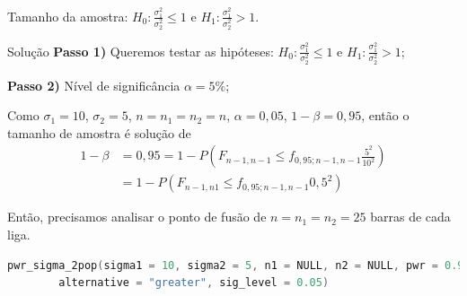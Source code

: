 \documentclass[9pt]{beamer}
\begin{document}
\begin{frame}[fragile]{Tamanho da amostra: $H_0:\frac{\sigma_1^2}{\sigma_2^2} \leq 1$ e $H_1:\frac{\sigma_1^2}{\sigma_2^2} > 1$.}

\begin{block}{Solução}
	\textbf{Passo 1)} Queremos testar as hipóteses: $H_0: \frac{\sigma_1^2}{\sigma_2^2} \leq 1$ e $H_1: \frac{\sigma_1^2}{\sigma_2^2} > 1$;
	
	\textbf{Passo 2)} Nível de significância $\alpha=5\%$;
	
	Como $\sigma_1=10$, $\sigma_2=5$, $n=n_1=n_2=n$, $\alpha=0,05$, $1-\beta = 0,95$, então o tamanho de amostra é solução de
	\begin{align*}
	1-\beta &= 0,95 = 1- P \left( F_{n-1, n-1} \leq f_{0,95; n-1, n-1} \frac{5^2}{10^2} \right)\\ 
	&= 1- P \left( F_{n-1, n1} \leq f_{0,95; n-1, n-1} 0,5^2 \right)
	\end{align*}
	
	Então, precisamos analisar o ponto de fusão de $n=n_1=n_2=25$  barras de cada liga.
\end{block}

\begin{lstlisting}[language = C, caption = Código no R.]
pwr_sigma_2pop(sigma1 = 10, sigma2 = 5, n1 = NULL, n2 = NULL, pwr = 0.95,
		alternative = "greater", sig_level = 0.05)
\end{lstlisting}
\end{frame}
\end{document}
